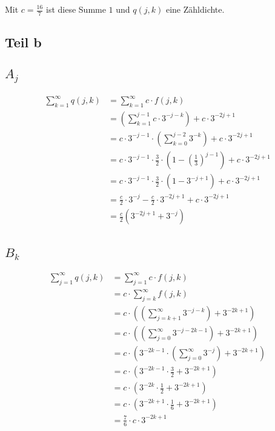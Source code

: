 \documentclass[10pt,a4paper]{article}
\begin{document}
Mit $c = \frac{16}{7}$ ist diese Summe $1$ und $q(j, k)$ eine Zähldichte.

\subsection{Teil b}

\subsection{$A_{j}$}
\begin{align*}
  \sum_{k = 1}^{\infty} q(j, k) & = \sum_{k = 1}^{\infty} c \cdot f(j, k)\\
  & = \left( \sum_{k = 1}^{j - 1} c \cdot 3^{-j - k} \right) + c \cdot 3^{-2j + 1}\\
  & = c \cdot 3^{-j - 1} \cdot \left( \sum_{k = 0}^{j - 2} 3^{-k} \right) + c \cdot 3^{-2j + 1}\\
  & = c \cdot 3^{-j - 1} \cdot \frac{3}{2} \cdot \left( 1 - \left( \frac{1}{3} \right)^{j - 1} \right) + c \cdot 3^{-2j + 1}\\
  & = c \cdot 3^{-j - 1} \cdot \frac{3}{2} \cdot \left( 1 - 3^{-j + 1} \right) + c \cdot 3^{-2j + 1}\\
  & = \frac{c}{2} \cdot 3^{-j} - \frac{c}{2} \cdot 3^{-2j + 1} + c \cdot 3^{-2j + 1}\\
  & = \frac{c}{2} \left( 3^{-2j + 1} + 3^{-j} \right)\\
\end{align*}

\subsection{$B_{k}$}
\begin{align*}
  \sum_{j = 1}^{\infty} q(j, k) & = \sum_{j = 1}^{\infty} c \cdot f(j, k)\\
  & = c \cdot \sum_{j = k}^{\infty} f(j, k)\\
  & = c \cdot \left( \left( \sum_{j = k + 1}^{\infty} 3^{-j - k} \right) + 3^{-2k + 1} \right)\\
  & = c \cdot \left( \left( \sum_{j = 0}^{\infty} 3^{-j - 2k - 1} \right) + 3^{-2k + 1} \right)\\
  & = c \cdot \left( 3^{-2k - 1} \cdot \left( \sum_{j = 0}^{\infty} 3^{-j} \right) + 3^{-2k + 1} \right)\\
  & = c \cdot \left( 3^{-2k - 1} \cdot \frac{3}{2} + 3^{-2k + 1} \right)\\
  & = c \cdot \left( 3^{-2k} \cdot \frac{1}{2} + 3^{-2k + 1} \right)\\
  & = c \cdot \left( 3^{-2k + 1} \cdot \frac{1}{6} + 3^{-2k + 1} \right)\\
  & = \frac{7}{6} \cdot c \cdot 3^{-2k + 1}\\
\end{align*}
\end{document}
